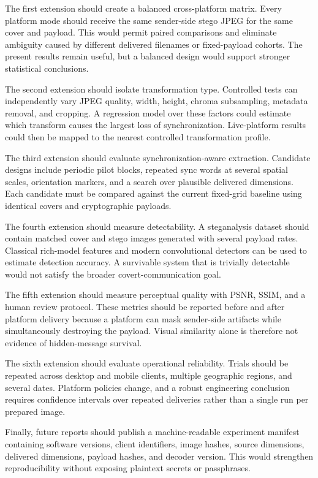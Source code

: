 \documentclass[conference]{IEEEtran}
\begin{document}
The first extension should create a balanced cross-platform matrix. Every platform mode should receive the same sender-side stego JPEG for the same cover and payload. This would permit paired comparisons and eliminate ambiguity caused by different delivered filenames or fixed-payload cohorts. The present results remain useful, but a balanced design would support stronger statistical conclusions.

The second extension should isolate transformation type. Controlled tests can independently vary JPEG quality, width, height, chroma subsampling, metadata removal, and cropping. A regression model over these factors could estimate which transform causes the largest loss of synchronization. Live-platform results could then be mapped to the nearest controlled transformation profile.

The third extension should evaluate synchronization-aware extraction. Candidate designs include periodic pilot blocks, repeated sync words at several spatial scales, orientation markers, and a search over plausible delivered dimensions. Each candidate must be compared against the current fixed-grid baseline using identical covers and cryptographic payloads.

The fourth extension should measure detectability. A steganalysis dataset should contain matched cover and stego images generated with several payload rates. Classical rich-model features and modern convolutional detectors can be used to estimate detection accuracy. A survivable system that is trivially detectable would not satisfy the broader covert-communication goal.

The fifth extension should measure perceptual quality with PSNR, SSIM, and a human review protocol. These metrics should be reported before and after platform delivery because a platform can mask sender-side artifacts while simultaneously destroying the payload. Visual similarity alone is therefore not evidence of hidden-message survival.

The sixth extension should evaluate operational reliability. Trials should be repeated across desktop and mobile clients, multiple geographic regions, and several dates. Platform policies change, and a robust engineering conclusion requires confidence intervals over repeated deliveries rather than a single run per prepared image.

Finally, future reports should publish a machine-readable experiment manifest containing software versions, client identifiers, image hashes, source dimensions, delivered dimensions, payload hashes, and decoder version. This would strengthen reproducibility without exposing plaintext secrets or passphrases.
\end{document}
